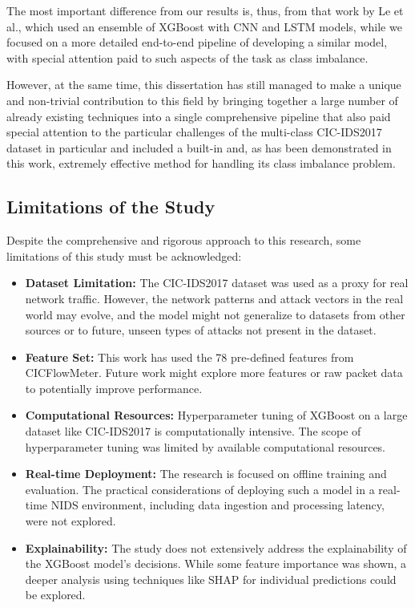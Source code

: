 The most important difference from our results is, thus, from that work by Le et al.\parencite{le2021ensemble}, which used an ensemble of XGBoost with CNN and LSTM models, while we focused on a more detailed end-to-end pipeline of developing a similar model, with special attention paid to such aspects of the task as class imbalance.

However, at the same time, this dissertation has still managed to make a unique and non-trivial contribution to this field by bringing together a large number of already existing techniques into a single comprehensive pipeline that also paid special attention to the particular challenges of the multi-class CIC-IDS2017 dataset in particular and included a built-in and, as has been demonstrated in this work, extremely effective method for handling its class imbalance problem.

\subsection{Limitations of the Study}

Despite the comprehensive and rigorous approach to this research, some limitations of this study must be acknowledged:

\begin{itemize}
	\item \textbf{Dataset Limitation: } The CIC-IDS2017 dataset was used as a proxy for real network traffic. However, the network patterns and attack vectors in the real world may evolve, and the model might not generalize to datasets from other sources or to future, unseen types of attacks not present in the dataset.
	\item \textbf{Feature Set: } This work has used the 78 pre-defined features from CICFlowMeter. Future work might explore more features or raw packet data to potentially improve performance.
	\item \textbf{Computational Resources: } Hyperparameter tuning of XGBoost on a large dataset like CIC-IDS2017 is computationally intensive. The scope of hyperparameter tuning was limited by available computational resources.
	\item \textbf{Real-time Deployment: } The research is focused on offline training and evaluation. The practical considerations of deploying such a model in a real-time NIDS environment, including data ingestion and processing latency, were not explored.
	\item \textbf{Explainability: } The study does not extensively address the explainability of the XGBoost model's decisions. While some feature importance was shown, a deeper analysis using techniques like SHAP for individual predictions could be explored.
\end{itemize}

